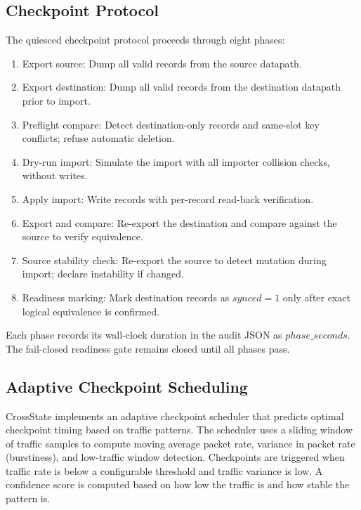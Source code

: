 \documentclass[10pt, conference, compsoc]{IEEEtran}
\begin{document}
\subsection{Checkpoint Protocol}
\label{subsec:checkpoint_protocol}
The quiesced checkpoint protocol proceeds through eight phases:

\begin{enumerate}
    \item Export source: Dump all valid records from the source datapath.
    \item Export destination: Dump all valid records from the destination
          datapath prior to import.
    \item Preflight compare: Detect destination-only records and same-slot key
          conflicts; refuse automatic deletion.
    \item Dry-run import: Simulate the import with all importer collision
          checks, without writes.
    \item Apply import: Write records with per-record read-back verification.
    \item Export and compare: Re-export the destination and compare against
          the source to verify equivalence.
    \item Source stability check: Re-export the source to detect mutation during
          import; declare instability if changed.
    \item Readiness marking: Mark destination records as $synced=1$ only after
          exact logical equivalence is confirmed.
\end{enumerate}

Each phase records its wall-clock duration in the audit JSON as
$phase\_seconds$. The fail-closed readiness gate remains closed until all
phases pass.

\subsection{Adaptive Checkpoint Scheduling}
\label{subsec:adaptive_sched}
CrossState implements an adaptive checkpoint scheduler that predicts optimal
checkpoint timing based on traffic patterns. The scheduler uses a sliding window
of traffic samples to compute moving average packet rate, variance in packet
rate (burstiness), and low-traffic window detection. Checkpoints are triggered
when traffic rate is below a configurable threshold and traffic variance is low.
A confidence score is computed based on how low the traffic is and how stable
the pattern is.
\end{document}
